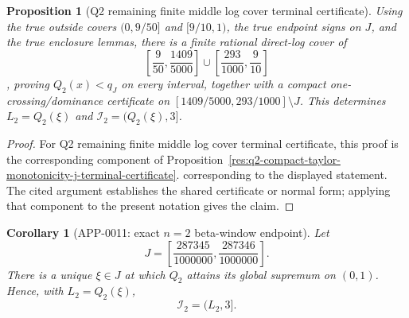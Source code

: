 \documentclass[11pt]{article}
\numberwithin{equation}{section}
\newtheorem{proposition}[theorem]{Proposition}
\newtheorem{corollary}[theorem]{Corollary}
\theoremstyle{definition}
\theoremstyle{remark}
\newcommand{\1}{\mathbf 1}
\begin{document}
\begin{proposition}[Q2 remaining finite middle log cover terminal certificate]
\label{res:q2-remaining-finite-middle-log-cover-terminal-certificate}
Using the true outside covers \((0,9/50]\) and \([9/10,1)\), the true endpoint signs on \(J\), and the true enclosure lemmas, there is a finite rational direct-log cover of
\[
\left[\frac{9}{50},\frac{1409}{5000}\right]
\cup
\left[\frac{293}{1000},\frac{9}{10}\right]
\],
proving \(Q_2(x)<q_J\) on every interval, together with a compact one-crossing/dominance certificate on \([1409/5000,293/1000]\setminus J\). This determines \(L_2=Q_2(\xi)\) and \(\mathcal I_2=(Q_2(\xi),3]\).
\end{proposition}

\begin{proof}
For Q2 remaining finite middle log cover terminal certificate, this proof is the corresponding component of Proposition~\ref{res:q2-compact-taylor-monotonicity-j-terminal-certificate}.  corresponding to the displayed statement.  The cited argument establishes the shared certificate or normal form; applying that component to the present notation gives the claim.
\end{proof}

\begin{corollary}[APP-0011: exact \(n=2\) beta-window endpoint]
\label{thm:q2-exact-endpoint}
Let
\begin{equation}
\label{eq:q2-J-bracket}
J=\left[\frac{287345}{1000000},\frac{287346}{1000000}\right].
\end{equation}
There is a unique \(\xi\in J\) at which \(Q_2\) attains its global supremum on \((0,1)\).  Hence, with \(L_2=Q_2(\xi)\),
\begin{equation}
\label{eq:q2-I2-exact}
\mathcal I_2=(L_2,3].
\end{equation}


\end{corollary}
\end{document}
